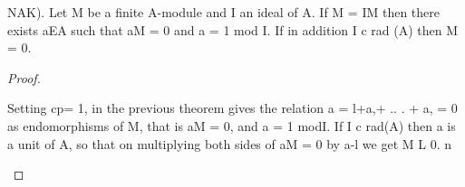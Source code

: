 \begin{theorem}[Theorem 2.2]\label{mcrt-auto-theorem-2-2}\uses{}
\begin{mathematicalrecord}
NAK). Let M be a finite A-module and I an ideal of A. If
M = IM    then there exists aEA such that aM = 0 and a = 1 mod I. If in
addition I c rad (A) then M = 0.
\end{mathematicalrecord}
\end{theorem}
\begin{proof}
\begin{mathematicalrecord}
Setting cp= 1, in the previous theorem gives the relation a =
l+a,+    .. . + a, = 0 as endomorphisms   of M, that is aM = 0, and
a = 1 modI. If I c rad(A) then a is a unit of A, so that on multiplying
both sides of aM = 0 by a-l we get M L 0. n
\end{mathematicalrecord}
\end{proof}



